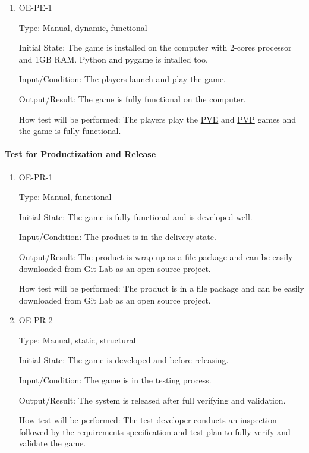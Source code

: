 \documentclass[12pt, titlepage]{article}
\begin{document}
\begin{enumerate}

\item{OE-PE-1\\}

Type: Manual, dynamic, functional
					
Initial State: The game is installed on the computer with 2-cores processor and 1GB RAM. Python and pygame is intalled too.

Input/Condition: The players launch and play the game.
					
Output/Result: The game is fully functional on the computer.
					
How test will be performed: The players play the \underline{PVE} and \underline{PVP} games and the game is fully functional.

\end{enumerate}

\paragraph{Test for Productization and Release}

\begin{enumerate}

\item{OE-PR-1\\}

Type: Manual, functional
					
Initial State: The game is fully functional and is developed well.

Input/Condition: The product is in the delivery state.
					
Output/Result: The product is wrap up as a file package and can be easily downloaded from Git Lab as an open source project.
					
How test will be performed: The product is in a file package and can be easily downloaded from Git Lab as an open source project.

\item{OE-PR-2\\}

Type: Manual, static, structural
					
Initial State: The game is developed and before releasing.

Input/Condition: The game is in the testing process.
					
Output/Result: The system is released after full verifying and validation.
					
How test will be performed: The test developer conducts an inspection followed by the requirements specification and test plan to fully verify and validate the game.

\end{enumerate}
\end{document}
